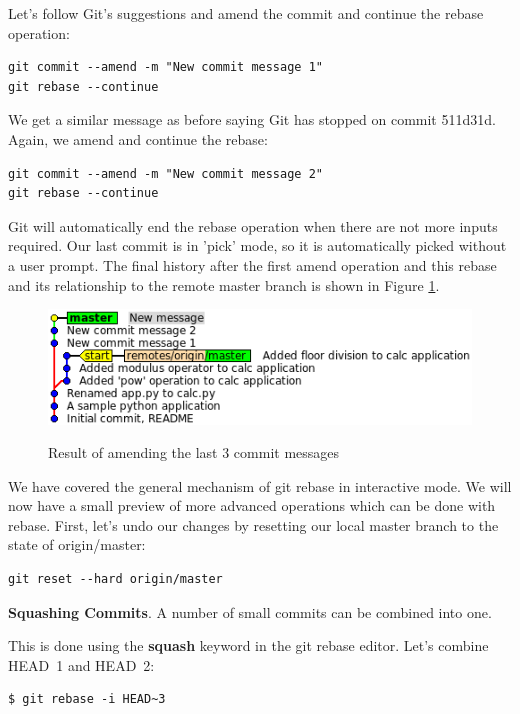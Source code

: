 \documentclass[a4paper]{../../common/tufte-latex/tufte-handout}
\begin{document}
Let's follow Git's suggestions and amend the commit and continue the rebase operation:

\begin{lstlisting}[style=BashInputStyle]
git commit --amend -m "New commit message 1"
git rebase --continue
\end{lstlisting}

We get a similar message as before saying Git has stopped on commit 511d31d.
Again, we amend and continue the rebase:

\begin{lstlisting}[style=BashInputStyle]
git commit --amend -m "New commit message 2"
git rebase --continue
\end{lstlisting}

Git will automatically end the rebase operation when there are not more inputs required.
Our last commit is in 'pick' mode, so it is automatically picked without a user prompt.
The final history after the first amend operation and this rebase and its relationship to the remote master branch is shown in Figure \ref{fig:gitrebase-amend}.

\begin{figure}%
  \centering
  \includegraphics[width=0.75\linewidth]{gitrebase-amend.png}
  \label{fig:gitrebase-amend}
  \caption{Result of amending the last 3 commit messages}
\end{figure}

\noindent We have covered the general mechanism of git rebase in interactive mode. 
We will now have a small preview of more advanced operations which can be done with rebase.
First, let's undo our changes by resetting our local master branch to the state of origin/master:

\begin{lstlisting}[style=BashInputStyle]
  git reset --hard origin/master
\end{lstlisting}

\noindent \textbf{Squashing Commits}.
A number of small commits can be combined into one.

This is done using the \textbf{squash} keyword in the git rebase editor.
Let's combine HEAD~1 and HEAD~2:

\begin{lstlisting}[style=BashInputStyle]
  $ git rebase -i HEAD~3
\end{lstlisting}
\end{document}
